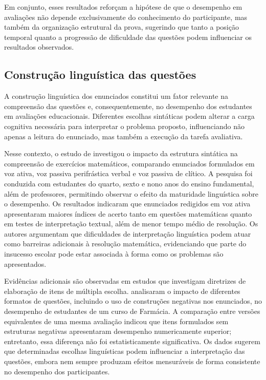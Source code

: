 \documentclass[a4paper,10pt, twocolumn]{article}
\begin{document}
Em conjunto, esses resultados reforçam a hipótese de que o desempenho em avaliações não depende exclusivamente do conhecimento do participante, mas também da organização estrutural da prova, sugerindo que tanto a posição temporal quanto a progressão de dificuldade das questões podem influenciar os resultados observados.

\subsection{Construção linguística das questões}

A construção linguística dos enunciados constitui um fator relevante na compreensão das questões e, consequentemente, no desempenho dos estudantes em avaliações educacionais. Diferentes escolhas sintáticas podem alterar a carga cognitiva necessária para interpretar o problema proposto, influenciando não apenas a leitura do enunciado, mas também a execução da tarefa avaliativa.

Nesse contexto, o estudo de \textcite{correia2004complexidade} investigou o impacto da estrutura sintática na compreensão de exercícios matemáticos, comparando enunciados formulados em voz ativa, voz passiva perifrástica verbal e voz passiva de clítico. A pesquisa foi conduzida com estudantes do quarto, sexto e nono anos do ensino fundamental, além de professores, permitindo observar o efeito da maturidade linguística sobre o desempenho. Os resultados indicaram que enunciados redigidos em voz ativa apresentaram maiores índices de acerto tanto em questões matemáticas quanto em testes de interpretação textual, além de menor tempo médio de resolução. Os autores argumentam que dificuldades de interpretação linguística podem atuar como barreiras adicionais à resolução matemática, evidenciando que parte do insucesso escolar pode estar associada à forma como os problemas são apresentados.

Evidências adicionais são observadas em estudos que investigam diretrizes de elaboração de itens de múltipla escolha. \textcite{Caldwell2013} analisaram o impacto de diferentes formatos de questões, incluindo o uso de construções negativas nos enunciados, no desempenho de estudantes de um curso de Farmácia. A comparação entre versões equivalentes de uma mesma avaliação indicou que itens formulados sem estruturas negativas apresentaram desempenho numericamente superior; entretanto, essa diferença não foi estatisticamente significativa. Os dados sugerem que determinadas escolhas linguísticas podem influenciar a interpretação das questões, embora nem sempre produzam efeitos mensuráveis de forma consistente no desempenho dos participantes.
\end{document}
